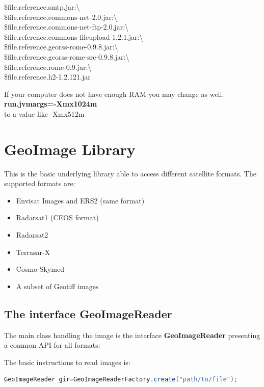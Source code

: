 \documentclass[12pt,a4paper,final,makeidx]{report}
\begin{document}
\begin{tiny}
\${file.reference.smtp.jar}:\textbackslash \\
\${file.reference.commons-net-2.0.jar}:\textbackslash \\
\${file.reference.commons-net-ftp-2.0.jar}:\textbackslash \\
\${file.reference.commons-fileupload-1.2.1.jar}:\textbackslash \\
\${file.reference.georss-rome-0.9.8.jar}:\textbackslash \\
\${file.reference.georss-rome-src-0.9.8.jar}:\textbackslash \\
\${file.reference.rome-0.9.jar}:\textbackslash \\
\${file.reference.h2-1.2.121.jar}\\
\end{tiny}
If your computer does not have enough RAM you may change as well:\\
\textbf{run.jvmargs=-Xmx1024m}\\
to a value like -Xmx512m



\chapter{GeoImage Library}

This is the basic underlying library able to access different satellite formats. The supported formats are:
\begin{itemize}
\item Envisat Images and ERS2 (same format)
\item Radarsat1 (CEOS format)
\item Radarsat2
\item Terrasar-X
\item Cosmo-Skymed
\item A subset of Geotiff images
\end{itemize}
\section{The interface GeoImageReader}
The main class handling the image is the interface \textbf{GeoImageReader} presenting a common API for all formats:


The basic instructions to read images is:
\begin{lstlisting}[language=Java]
GeoImageReader gir=GeoImageReaderFactory.create("path/to/file");
\end{lstlisting}
\end{document}
